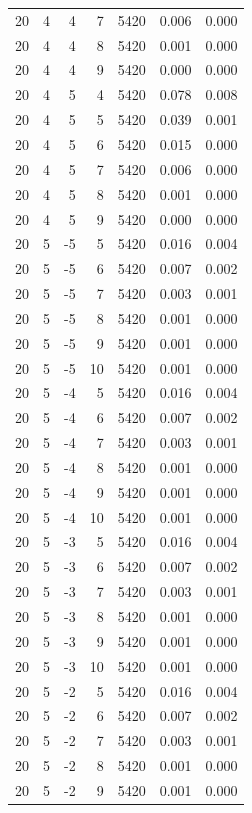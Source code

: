 \begin{table}
\begin{tabular}{rrrrrrr}
20 & 4 & 4 & 7 & 5420 & 0.006 & 0.000 \\
20 & 4 & 4 & 8 & 5420 & 0.001 & 0.000 \\
20 & 4 & 4 & 9 & 5420 & 0.000 & 0.000 \\
20 & 4 & 5 & 4 & 5420 & 0.078 & 0.008 \\
20 & 4 & 5 & 5 & 5420 & 0.039 & 0.001 \\
20 & 4 & 5 & 6 & 5420 & 0.015 & 0.000 \\
20 & 4 & 5 & 7 & 5420 & 0.006 & 0.000 \\
20 & 4 & 5 & 8 & 5420 & 0.001 & 0.000 \\
20 & 4 & 5 & 9 & 5420 & 0.000 & 0.000 \\
20 & 5 & -5 & 5 & 5420 & 0.016 & 0.004 \\
20 & 5 & -5 & 6 & 5420 & 0.007 & 0.002 \\
20 & 5 & -5 & 7 & 5420 & 0.003 & 0.001 \\
20 & 5 & -5 & 8 & 5420 & 0.001 & 0.000 \\
20 & 5 & -5 & 9 & 5420 & 0.001 & 0.000 \\
20 & 5 & -5 & 10 & 5420 & 0.001 & 0.000 \\
20 & 5 & -4 & 5 & 5420 & 0.016 & 0.004 \\
20 & 5 & -4 & 6 & 5420 & 0.007 & 0.002 \\
20 & 5 & -4 & 7 & 5420 & 0.003 & 0.001 \\
20 & 5 & -4 & 8 & 5420 & 0.001 & 0.000 \\
20 & 5 & -4 & 9 & 5420 & 0.001 & 0.000 \\
20 & 5 & -4 & 10 & 5420 & 0.001 & 0.000 \\
20 & 5 & -3 & 5 & 5420 & 0.016 & 0.004 \\
20 & 5 & -3 & 6 & 5420 & 0.007 & 0.002 \\
20 & 5 & -3 & 7 & 5420 & 0.003 & 0.001 \\
20 & 5 & -3 & 8 & 5420 & 0.001 & 0.000 \\
20 & 5 & -3 & 9 & 5420 & 0.001 & 0.000 \\
20 & 5 & -3 & 10 & 5420 & 0.001 & 0.000 \\
20 & 5 & -2 & 5 & 5420 & 0.016 & 0.004 \\
20 & 5 & -2 & 6 & 5420 & 0.007 & 0.002 \\
20 & 5 & -2 & 7 & 5420 & 0.003 & 0.001 \\
20 & 5 & -2 & 8 & 5420 & 0.001 & 0.000 \\
20 & 5 & -2 & 9 & 5420 & 0.001 & 0.000 \\

\end{tabular}
\end{table}
